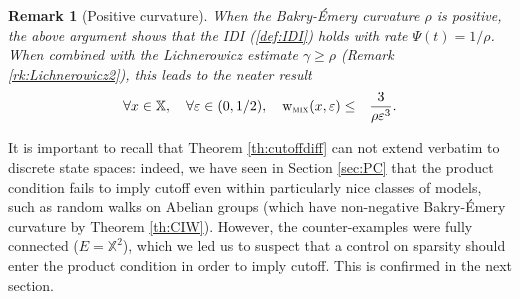 \documentclass[12pt,final]{article}
\newtheorem{remark}{Remark}[section]
\numberwithin{equation}{section}
\newcommand{\dX}{\mathbb{X}}
\newcommand{\wmix}{{\rm w}_{\textsc{mix}}}
\begin{document}
\begin{remark}[Positive curvature]When the Bakry-\'Emery curvature $\rho$ is positive, the above argument shows that the IDI (\ref{def:IDI}) holds with  rate $\Psi(t)=1/\rho$.  When combined with the Lichnerowicz estimate $\gamma\ge\rho$ (Remark \ref{rk:Lichnerowicz2}), this leads to the neater result
\begin{eqnarray*}
\forall x\in\dX,\quad \forall\varepsilon\in(0,1/2),\quad \wmix(x,\varepsilon) & \le & \frac{3}{\rho\varepsilon^3}.
\end{eqnarray*} 
\end{remark}
It is important to recall that Theorem \ref{th:cutoffdiff} can not  extend verbatim to discrete state spaces: indeed, we have seen in Section \ref{sec:PC} that the product condition fails to imply cutoff even within particularly  nice classes of models, such as random walks on Abelian groups (which have non-negative Bakry-\'Emery curvature by Theorem \ref{th:CIW}). However, the counter-examples were fully connected ($E=\dX^2$), which we led us to suspect that a control on sparsity should enter the product condition in order to imply cutoff. This is confirmed in the next section.
\end{document}
